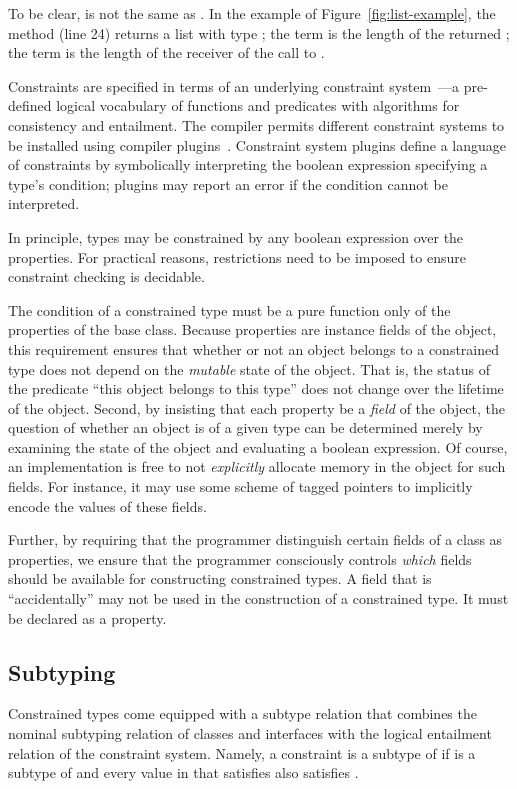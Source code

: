 To be clear,  is not the same as .  In the
 example of Figure~\ref{fig:list-example}, the
 method (line 24) returns
a list with type
; the term
 is the length of
the returned ; the term  is the length of the 
receiver of the call to .

Constraints are specified in terms of an underlying
constraint system~\cite{CCCC}---a pre-defined logical vocabulary of
functions and predicates with algorithms for consistency and
entailment.  The \Xten{} compiler permits different constraint
systems to be installed using compiler
plugins~\cite{bracha04-pluggable}.
%
Constraint system plugins define a language of constraints by
symbolically interpreting
the boolean expression specifying a type's condition; plugins
may report an error if the condition cannot be interpreted.

In principle, types may be constrained by any boolean
expression over the properties.  For practical reasons,
restrictions need to be imposed to ensure constraint checking is
decidable.

The condition of a constrained type must be a pure
function only of the properties of the base class.
Because properties are
 instance fields of the object,
this requirement
ensures that whether or not an object belongs to a constrained type does
not depend on the {\em mutable} state of the object.
That is, the status of the
predicate ``this object belongs to this type'' does not
change over the lifetime of the object.  Second, by insisting that each
property be a {\em field} of the object, the question of
whether an object is of a given type can be
determined merely by examining the state of the object and evaluating
a boolean expression. Of course, an implementation is free to not {\em
explicitly} allocate memory in the object for such fields. For
instance, it may use some scheme of tagged pointers to implicitly
encode the values of these fields.

Further, by requiring that the programmer distinguish certain
 fields of a class as properties, we ensure that the programmer
consciously controls {\em which}  fields should be available for
constructing constrained types. A field that is ``accidentally''
 may not be used in the construction of a constrained type. It must be
declared as a property.


\subsection{Subtyping}
Constrained types come equipped with a subtype relation that
combines the nominal subtyping relation of classes and interfaces with
the logical entailment relation of the constraint system. Namely, a
constraint  is a subtype of  if  is a
subtype of  and every value in  that satisfies 
also satisfies .


